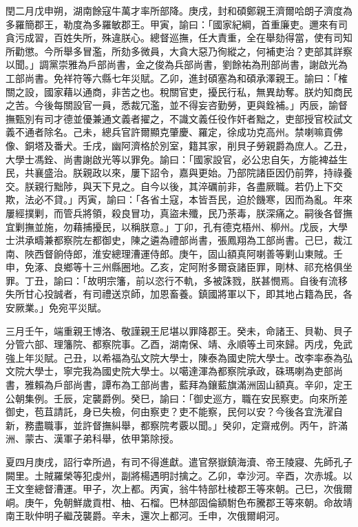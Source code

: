 \begin{pinyinscope}
閏二月戊申朔，湖南餘寇牛萬才率所部降。庚戌，封和碩鄭親王濟爾哈朗子濟度為多羅簡郡王，勒度為多羅敏郡王。甲寅，諭曰：「國家紀綱，首重廉吏。邇來有司貪污成習，百姓失所，殊違朕心。總督巡撫，任大責重，全在舉劾得當，使有司知所勸懲。今所舉多冒濫，所劾多微員，大貪大惡乃徇縱之，何補吏治？吏部其詳察以聞。」調黨崇雅為戶部尚書，金之俊為兵部尚書，劉餘祐為刑部尚書，謝啟光為工部尚書。免祥符等六縣七年災賦。乙卯，進封碩塞為和碩承澤親王。諭曰：「榷關之設，國家藉以通商，非苦之也。稅關官吏，擾民行私，無異劫奪。朕灼知商民之苦。今後每關設官一員，悉裁冗濫，並不得妄咨勤勞，更與銓補。」丙辰，諭督撫甄別有司才德並優兼通文義者擢之，不識文義任役作奸者黜之，吏部授官校試文義不通者除名。己未，總兵官許爾顯克肇慶、羅定，徐成功克高州。禁喇嘛貢佛像、銅塔及番犬。壬戌，幽阿濟格於別室，籍其家，削貝子勞親爵為庶人。乙丑，大學士馮銓、尚書謝啟光等以罪免。諭曰：「國家設官，必公忠自矢，方能裨益生民，共襄盛治。朕親政以來，屢下詔令，嘉與更始。乃部院諸臣因仍前弊，持祿養交。朕親行黜陟，與天下見之。自今以後，其淬礪前非，各盡厥職。若仍上下交欺，法必不貸。」丙寅，諭曰：「各省土寇，本皆吾民，迫於饑寒，因而為亂。年來屢經撲剿，而管兵將領，殺良冒功，真盜未殲，民乃荼毒，朕深痛之。嗣後各督撫宜剿撫並施，勿藉捕擾民，以稱朕意。」丁卯，孔有德克梧州、柳州。戊辰，大學士洪承疇兼都察院左都御史，陳之遴為禮部尚書，張鳳翔為工部尚書。己巳，裁江南、陜西督餉侍郎，淮安總理漕運侍郎。庚午，固山額真阿喇善等剿山東賊。壬申，免涿、良鄉等十三州縣圈地。乙亥，定阿附多爾袞諸臣罪，剛林、祁充格俱坐罪。丁丑，諭曰：「故明宗籓，前以恣行不軌，多被誅戮，朕甚憫焉。自後有流移失所甘心投誠者，有司禮送京師，加恩畜養。鎮國將軍以下，即其地占籍為民，各安厥業。」免宛平災賦。

三月壬午，端重親王博洛、敬謹親王尼堪以罪降郡王。癸未，命諸王、貝勒、貝子分管六部、理籓院、都察院事。乙酉，湖南保、靖、永順等土司來歸。丙戌，免武強上年災賦。己丑，以希福為弘文院大學士，陳泰為國史院大學士。改李率泰為弘文院大學士，寧完我為國史院大學士。以噶達渾為都察院承政，硃瑪喇為吏部尚書，雅賴為戶部尚書，譚布為工部尚書，藍拜為鑲藍旗滿洲固山額真。辛卯，定王公朝集例。壬辰，定襲爵例。癸巳，諭曰：「御史巡方，職在安民察吏。向來所差御史，苞苴請託，身已失檢，何由察吏？吏不能察，民何以安？今後各宜洗濯自新，務盡職事，並許督撫糾舉，都察院考覈以聞。」癸卯，定齋戒例。丙午，許滿洲、蒙古、漢軍子弟科舉，依甲第除授。

夏四月庚戌，詔行幸所過，有司不得進獻。遣官祭嶽鎮海瀆、帝王陵寢、先師孔子闕里。土賊羅榮等犯虔州，副將楊遇明討擒之。乙卯，幸沙河。辛酉，次赤城。以王文奎總督漕運。甲子，次上都。丙寅，翁牛特部杜棱郡王等來朝。己巳，次俄爾峒。庚午，免朝鮮歲貢柑、柚、石榴。巴林部固倫額駙色布騰郡王等來朝。命故靖南王耿仲明子繼茂襲爵。辛未，還次上都河。壬申，次俄爾峒河。


\end{pinyinscope}
